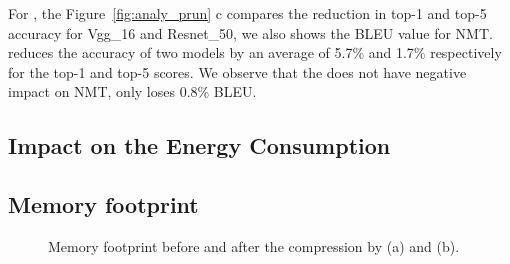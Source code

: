 For \pruning, the Figure~\ref{fig:analy_prun} c compares the reduction in top-1 and top-5 accuracy for Vgg\_16 and Resnet\_50, 
we also shows the BLEU value for NMT.
\pruning reduces the accuracy of two models by an average of 5.7\% and 1.7\% respectively for the top-1 and top-5 scores.
We observe that the \pruning does not have negative impact on NMT, only loses 0.8\% BLEU. 





\subsection{Impact on the Energy Consumption}


\subsection{Memory footprint}

\begin{figure}[!t]
\centering
{}
\hfill
{}
\hfill

\caption{Memory footprint before and after the compression by \quantization(a) and \pruning (b).}
\label{fig:footprint}
\end{figure}
